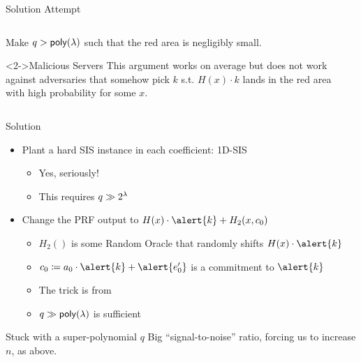 \documentclass[xcolor=table,10pt,aspectratio=169]{beamer}
\begin{document}
\begin{frame}[label={sec:org317d417}]{Solution Attempt}
\begin{columns}
\begin{column}{0.5\columnwidth}
Make \(q > \poly\) such that the red area is negligibly small.
\begin{block}<2->{Malicious Servers}
This argument works on average but does not work against adversaries that somehow pick \(k\) s.t. \(H(x) \cdot k\) lands in the red area with high probability for some \(x\).
\end{block}
\end{column}
\begin{column}{0.5\columnwidth}
\end{column}
\end{columns}
\end{frame}
\begin{frame}[label={sec:orgc922523}]{Solution}
\begin{itemize}
\item Plant a hard SIS instance in each coefficient: 1D-SIS \cite{PKC:ADDS21}
\pause
\begin{itemize}
\item Yes, seriously!
\item This requires \(q \gg 2^{\lambda}\)
\end{itemize}
\pause
\item Change the PRF output to \(H(x) \cdot \alert{k} + H_{2}(x,c_0)\) \cite{AC:AlbGur24}
\begin{itemize}
\item \(H_{2}()\) is some Random Oracle that randomly shifts \(H(x) \cdot \alert{k}\)
\item \(c_{0} \coloneqq a_{0} \cdot \alert{k} + \alert{e_{0}'}\) is a commitment to \(\alert{k}\)
\item The trick is from \cite{USENIX:GKQMS24}
\item \(q \gg \poly\) is sufficient
\end{itemize}
\end{itemize}
\begin{block}{Stuck with a super-polynomial \(q\)}
Big ``signal-to-noise'' ratio, forcing us to increase \(n\), as above.
\end{block}
\end{frame}
\end{document}
